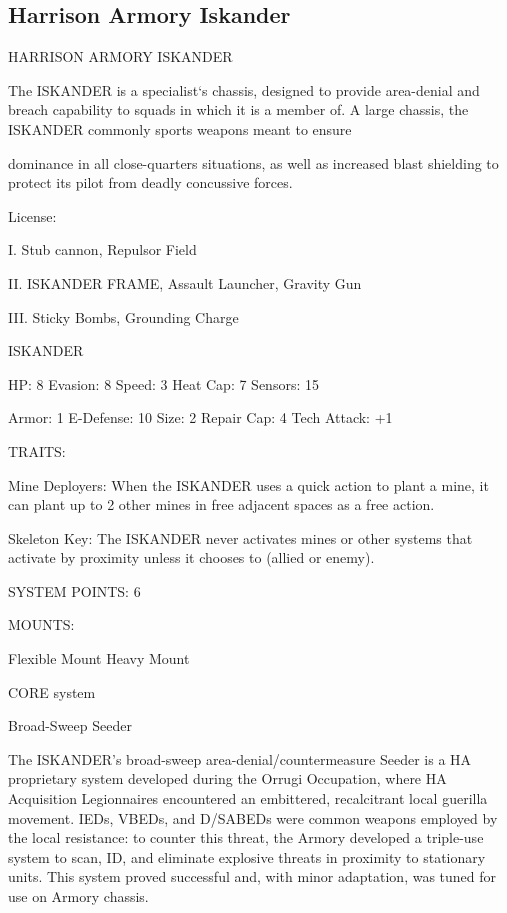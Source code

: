 \subsection{Harrison Armory Iskander}

                              HARRISON ARMORY ISKANDER

The ISKANDER is a specialist‘s chassis, designed to provide area-denial and breach capability to squads in
which it is a member of. A large chassis, the ISKANDER commonly sports weapons meant to ensure

dominance in all close-quarters situations, as well as increased blast shielding to protect its pilot from
deadly concussive forces.

                                                   License:

I. Stub cannon, Repulsor Field

II. ISKANDER FRAME, Assault Launcher, Gravity Gun

III. Sticky Bombs, Grounding Charge


                                                ISKANDER

 HP: 8          Evasion: 8                            Speed: 3           Heat Cap: 7        Sensors: 15

 Armor: 1       E-Defense: 10                         Size: 2            Repair Cap: 4      Tech Attack:
                                                                                            +1

                                                  TRAITS:

 Mine Deployers: When the ISKANDER uses a quick action to plant a mine, it can plant up to 2 other
 mines in free adjacent spaces as a free action.

 Skeleton Key: The ISKANDER never activates mines or other systems that activate by proximity unless
 it chooses to (allied or enemy).

                                            SYSTEM POINTS: 6

                                                  MOUNTS:

 Flexible Mount                    Heavy Mount

                                               CORE system




                                             Broad-Sweep Seeder

 The ISKANDER’s broad-sweep area-denial/countermeasure Seeder is a HA proprietary system
 developed during the Orrugi Occupation, where HA Acquisition Legionnaires encountered an
 embittered, recalcitrant local guerilla movement. IEDs, VBEDs, and D/SABEDs were common weapons
 employed by the local resistance: to counter this threat, the Armory developed a triple-use system to
 scan, ID, and eliminate explosive threats in proximity to stationary units. This system proved successful
 and, with minor adaptation, was tuned for use on Armory chassis.

